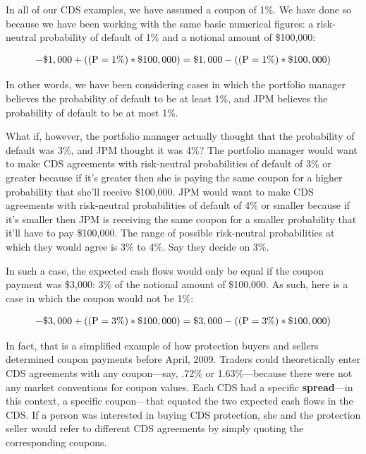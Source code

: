 \documentclass[article]{jss}
\begin{document}
In all of our CDS examples, we have assumed a coupon of 1\%. We have done so because we have been working with the same basic numerical figures: a risk-neutral probability of default of 1\% and a notional amount of \$100,000:

\begin{equation}
 \begin{aligned}
   {\rm - \$1,000 + ((P = 1\%) * \$100,000) = \$1,000 - ((P = 1\%) * \$100,000)}
    \end{aligned}
\end{equation}

In other words, we have been considering cases in which the portfolio manager believes the probability of default to be at least 1\%, and JPM believes the probability of default to be at most 1\%. 

What if, however, the portfolio manager actually thought that the probability of default was 3\%, and JPM thought it was 4\%? The portfolio manager would want to make CDS agreements with risk-neutral probabilities of default of 3\% or greater because if it's greater then she is paying the same coupon for a higher probability that she'll receive \$100,000. JPM would want to make CDS agreements with risk-neutral probabilities of default of 4\% or smaller because if it's smaller then JPM is receiving the same coupon for a smaller probability that it'll have to pay \$100,000. The range of possible risk-neutral probabilities at which they would agree is 3\% to 4\%. Say they decide on 3\%.

In such a case, the expected cash flows would only be equal if the coupon payment was \$3,000: 3\% of the notional amount of \$100,000. As such, here is a case in which the coupon would not be 1\%:

\begin{equation}
 \begin{aligned}
   {\rm - \$3,000 + ((P = 3\%) * \$100,000) = \$3,000 - ((P = 3\%) * \$100,000)}
    \end{aligned}
\end{equation}

In fact, that is a simplified example of how protection buyers and sellers determined coupon payments before April, 2009. Traders could theoretically enter CDS agreements with any coupon---say, .72\% or 1.63\%---because there were not any market conventions for coupon values. Each CDS had a specific \textbf{spread}---in this context, a specific coupon---that equated the two expected cash flows in the CDS. If a person was interested in buying CDS protection, she and the protection seller would refer to different CDS agreements by simply quoting the corresponding coupons.
\end{document}
